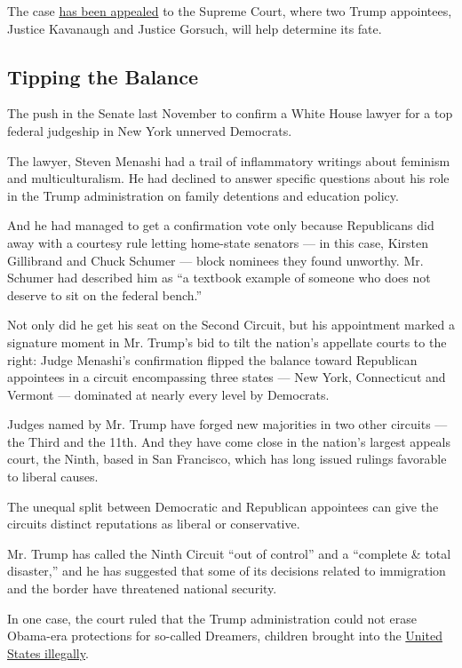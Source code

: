 The case
\href{https://www.nytimes.com/2019/12/05/us/trump-supreme-court-mazars.html}{has
been appealed} to the Supreme Court, where two Trump appointees, Justice
Kavanaugh and Justice Gorsuch, will help determine its fate.

\hypertarget{tipping-the-balance}{%
\subsection{Tipping the Balance}\label{tipping-the-balance}}

The push in the Senate last November to confirm a White House lawyer for
a top federal judgeship in New York unnerved Democrats.

The lawyer, Steven Menashi had a trail of inflammatory writings about
feminism and multiculturalism. He had declined to answer specific
questions about his role in the Trump administration on family
detentions and education policy.

And he had managed to get a confirmation vote only because Republicans
did away with a courtesy rule letting home-state senators --- in this
case, Kirsten Gillibrand and Chuck Schumer --- block nominees they found
unworthy. Mr. Schumer had described him as ``a textbook example of
someone who does not deserve to sit on the federal bench.''

Not only did he get his seat on the Second Circuit, but his appointment
marked a signature moment in Mr. Trump's bid to tilt the nation's
appellate courts to the right: Judge Menashi's confirmation flipped the
balance toward Republican appointees in a circuit encompassing three
states --- New York, Connecticut and Vermont --- dominated at nearly
every level by Democrats.

Judges named by Mr. Trump have forged new majorities in two other
circuits --- the Third and the 11th. And they have come close in the
nation's largest appeals court, the Ninth, based in San Francisco, which
has long issued rulings favorable to liberal causes.

The unequal split between Democratic and Republican appointees can give
the circuits distinct reputations as liberal or conservative.

Mr. Trump has called the Ninth Circuit ``out of control'' and a
``complete \& total disaster,'' and he has suggested that some of its
decisions related to immigration and the border have threatened national
security.

In one case, the court ruled that the Trump administration could not
erase Obama-era protections for so-called Dreamers, children brought
into the
\href{https://www.nytimes.com/2018/11/08/us/daca-dreamers-9th-circuit.html}{United
States illegally}.

